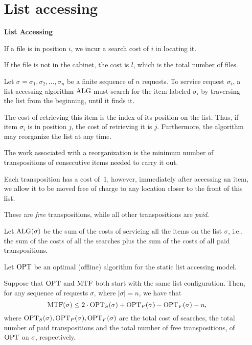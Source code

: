 
\newcommand{\mytitle}{Online}
\newcommand{\mychpnr}{5}


\section{List accessing}

\begin{frame}
{\bf List Accessing}

If a file is in position $i$, we incur a search cost of $i$ in
locating it.  

If the file is not in the cabinet, the cost is $l$, which is the total
number of files. 

Let $\sigma=\sigma_1,\sigma_2,\ldots,\sigma_n$ be a finite sequence of
$n$ requests.  To service request $\sigma_i$, a list accessing
algorithm $\mathrm{ALG}$ must search for the item labeled $\sigma_i$ by
traversing the list from the beginning, until it finds it.  

The cost of retrieving this item is the index of its position on the
list.  Thus, if item $\sigma_i$ is in position $j$, the cost of
retrieving it is $j$.  Furthermore, the algorithm may reorganize the
list at any time. 
\end{frame}

\begin{frame}
The work associated with a reorganization is the minimum number of
transpositions of consecutive items needed to carry it out.  

Each transposition has a cost of~1, however, immediately after
accessing an item, we allow it to be moved free of charge to any
location closer to the front of this list.  

These are {\em free} transpositions, while all other transpositions
are {\em paid}.  

Let $\mathrm{ALG}(\sigma)$ be the sum of the costs of servicing all the items
on the list $\sigma$, i.e., the sum of the costs of all the searches
plus the sum of the costs of all paid transpositions.
\end{frame}

\begin{frame}
Let $\mathrm{OPT}$ be an optimal (offline) algorithm for the static list
accessing model.  

Suppose that $\mathrm{OPT}$ and $\mathrm{MTF}$ both start with the same list
configuration.  Then, for any sequence of requests $\sigma$, where
$|\sigma|=n$, we have that 
$$
\mathrm{MTF}(\sigma)\le 2\cdot\mathrm{OPT}_S(\sigma)+\mathrm{OPT}_P(\sigma)-\mathrm{OPT}_F(\sigma)-n,
$$
where $\mathrm{OPT}_S(\sigma),\mathrm{OPT}_P(\sigma),\mathrm{OPT}_F(\sigma)$ are the total
cost of searches, the total number of paid transpositions and the
total number of free transpositions, of $\mathrm{OPT}$ on $\sigma$, respectively.
\end{frame}

